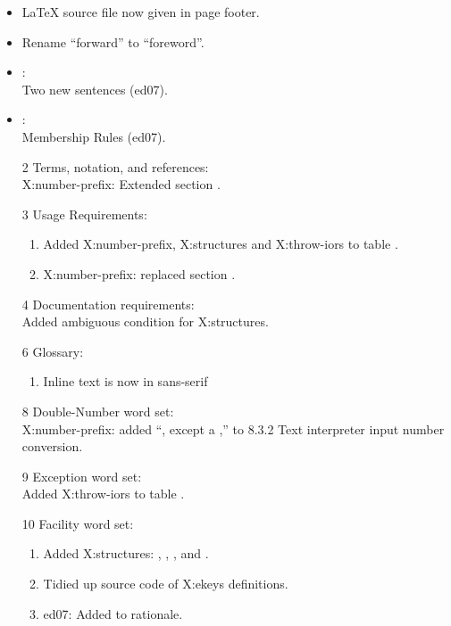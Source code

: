 	\begin{itemize}
	\item \LaTeX{} source file now given in page footer.

	\item Rename ``forward'' to ``foreword''.

	\item {}: \\
		Two new sentences (\textsf{ed07}).

	\item {}: \\
		Membership Rules (\textsf{ed07}).

	\item[2] Terms, notation, and references: \\
		\textsf{X:number-prefix}: Extended section
		.

	\item[3] Usage Requirements:
		\begin{enumerate}
		\item Added \textsf{X:number-prefix}, \textsf{X:structures}
			and \textsf{X:throw-iors} to table .
		\item \textsf{X:number-prefix}: replaced section
			.
		\end{enumerate}

	\item[4] Documentation requirements: \\
		Added ambiguous condition for \textsf{X:structures}.

	\item[6] Glossary:
		\begin{enumerate}
		\item Inline text is now in sans-serif
		\end{enumerate}

	\item[8] Double-Number word set: \\
		\textsf{X:number-prefix}: added ``, except a ,''
		to 8.3.2 Text interpreter input number conversion.

	\item[9] Exception word set: \\
		Added \textsf{X:throw-iors} to table .

	\item[10] Facility word set:
		\begin{enumerate}
		\item Added \textsf{X:structures}:
			,
			,
			,
			 and
			.
		\item Tidied up source code of \textsf{X:ekeys} definitions.
		\item \textsf{ed07}: Added to  rationale.
		\end{enumerate}


\end{itemize}
